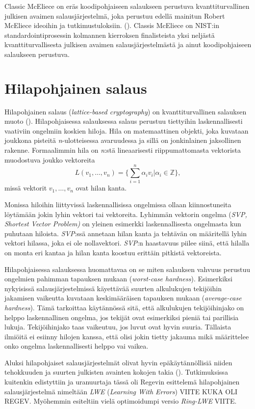 Classic McEliece on eräs koodipohjaiseen salaukseen perustuva kvanttiturvallinen julkisen avaimen salausjärjestelmä, joka perustuu edellä mainitun Robert McEliece ideoihin ja tutkimustuloksiin. (\cite{alagic2020status}). Classis McEliece on NIST:in standardointiprosessin kolmannen kierroksen finalisteista yksi neljästä kvanttiturvallisesta julkisen avaimen salausjärjestelmästä ja ainut koodipohjaiseen salaukseen perustuva.

\section{Hilapohjainen salaus}
Hilapohjainen salaus (\emph{lattice-based cryptography}) on kvanttiturvallinen salauksen muoto (\cite{regev2006lattice}). Hilapohjaisessa salauksessa salaus perustuu tiettyihin laskennallisesti vaativiin ongelmiin koskien hiloja. Hila on matemaattinen objekti, joka kuvataan joukkona pisteitä \emph{n}-ulotteisessa avaruudessa ja sillä on jonkinlainen jaksollinen rakenne. Formaalimmin hila on \emph{n}:stä lineaarisesti riippumattomasta vektorista muodostuva joukko vektoreita 
\[L(v_1, \ldots ,v_n) =\Bigg\{ {\sum_{i=1}^{n}\alpha_i 
v_i|\alpha_i \in \mathbb{Z}} \Bigg\},\]
missä vektorit $v_1, \ldots ,v_n$ ovat hilan kanta.

Monissa hiloihin liittyvissä 
laskennallisissa ongelmissa ollaan kiinnostuneita löytämään jokin lyhin vektori tai vektoreita. Lyhimmän vektorin ongelma (\emph{SVP, Shortest Vector Problem)} on yleinen esimerkki laskennallisesta ongelmasta kun puhutaan hiloista. \emph{SVP}:ssä annetaan hilan kanta ja tehtävän on määritellä lyhin vektori hilassa, joka ei ole nollavektori. \emph{SVP}:n haastavuus piilee siinä, että hilalla on monta eri kantaa ja hilan kanta koostuu erittäin pitkistä vektoreista.

Hilapohjaisessa salauksessa huomattavaa on se miten salauksen vahvuus perustuu ongelmien pahimman tapauksen mukaan (\emph{worst-case hardness}). Esimerkiksi nykyisissä salausjärjestelmissä käyettävää suurten alkulukujen tekijöihin jakamisen vaikeutta kuvataan keskimääräisen tapauksen mukaan (\emph{average-case hardness}). Tämä tarkoittaa käytännössä sitä, että alkulukujen tekijöihinjako on helppo laskennallinen ongelma, jos tekijät ovat esimerkiksi pieniä tai parillisia lukuja. Tekijöihinjako taas vaikeutuu, jos luvut ovat hyvin suuria. Tällaista ilmiöitä ei esiinny hilojen kanssa, että olisi jokin tietty jakauma mikä määrittelee onko ongelma laskennallisesti helppo vai vaikea.

Aluksi hilapohjaiset salausjärjestelmät olivat hyvin epäkäytännöllisiä niiden tehokkuuden ja suurten julkisten avainten kokojen takia (\cite{8275352}). Tutkimuksissa kuitenkin edistyttiin ja uranuurtaja tässä oli Regevin esittelemä hilapohjainen salausjärjestelmä nimeltään \emph{LWE} (\emph{Learning With Errors}) VIITE KUKA OLI REGEV. Myöhemmin esiteltiin vielä optimoidumpi versio \emph{Ring-LWE} VIITE.

